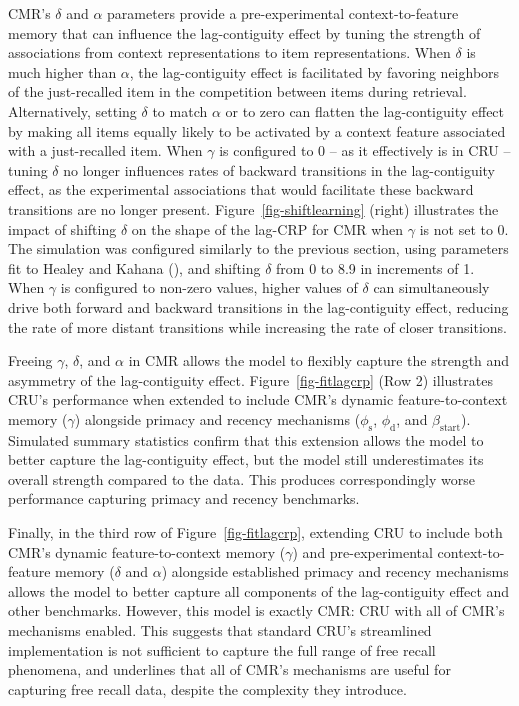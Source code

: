 \documentclass[
  man,
  floatsintext,
  longtable,
  nolmodern,
  notxfonts,
  notimes,
  draftfirst,
  colorlinks=true,linkcolor=blue,citecolor=blue,urlcolor=blue]{apa7}
\begin{document}
CMR's \(\delta\) and \(\alpha\) parameters provide a pre-experimental
context-to-feature memory that can influence the lag-contiguity effect
by tuning the strength of associations from context representations to
item representations. When \(\delta\) is much higher than \(\alpha\),
the lag-contiguity effect is facilitated by favoring neighbors of the
just-recalled item in the competition between items during retrieval.
Alternatively, setting \(\delta\) to match \(\alpha\) or to zero can
flatten the lag-contiguity effect by making all items equally likely to
be activated by a context feature associated with a just-recalled item.
When \(\gamma\) is configured to 0 -- as it effectively is in CRU --
tuning \(\delta\) no longer influences rates of backward transitions in
the lag-contiguity effect, as the experimental associations that would
facilitate these backward transitions are no longer present.
Figure~\ref{fig-shiftlearning} (right) illustrates the impact of
shifting \(\delta\) on the shape of the lag-CRP for CMR when \(\gamma\)
is not set to 0. The simulation was configured similarly to the previous
section, using parameters fit to Healey and Kahana
(), and shifting \(\delta\) from 0
to 8.9 in increments of 1. When \(\gamma\) is configured to non-zero
values, higher values of \(\delta\) can simultaneously drive both
forward and backward transitions in the lag-contiguity effect, reducing
the rate of more distant transitions while increasing the rate of closer
transitions.

Freeing \(\gamma\), \(\delta\), and \(\alpha\) in CMR allows the model
to flexibly capture the strength and asymmetry of the lag-contiguity
effect. Figure~\ref{fig-fitlagcrp} (Row 2) illustrates CRU's performance
when extended to include CMR's dynamic feature-to-context memory
(\(\gamma\)) alongside primacy and recency mechanisms
(\(\phi_\text{s}\), \(\phi_\text{d}\), and \(\beta_\text{start}\)).
Simulated summary statistics confirm that this extension allows the
model to better capture the lag-contiguity effect, but the model still
underestimates its overall strength compared to the data. This produces
correspondingly worse performance capturing primacy and recency
benchmarks.

Finally, in the third row of Figure~\ref{fig-fitlagcrp}, extending CRU
to include both CMR's dynamic feature-to-context memory (\(\gamma\)) and
pre-experimental context-to-feature memory (\(\delta\) and \(\alpha\))
alongside established primacy and recency mechanisms allows the model to
better capture all components of the lag-contiguity effect and other
benchmarks. However, this model is exactly CMR: CRU with all of CMR's
mechanisms enabled. This suggests that standard CRU's streamlined
implementation is not sufficient to capture the full range of free
recall phenomena, and underlines that all of CMR's mechanisms are useful
for capturing free recall data, despite the complexity they introduce.
\end{document}
